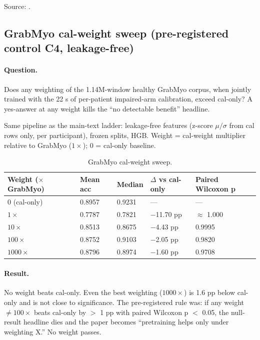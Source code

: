 \documentclass{article}
\begin{document}
Source: .

\subsection{GrabMyo cal-weight sweep (pre-registered control C4, leakage-free)}
\label{app:sweep-weights}

\paragraph{Question.} Does any weighting of the 1.14M-window healthy GrabMyo corpus, when jointly trained with the 22 s of per-patient impaired-arm calibration, exceed cal-only? A yes-answer at any weight kills the ``no detectable benefit'' headline.

Same pipeline as the main-text ladder: leakage-free features (z-score $\mu/\sigma$ from cal rows only, per participant), frozen splits, HGB. Weight = cal-weight multiplier relative to GrabMyo ($1\times$); 0 = cal-only baseline.

\begin{table}[h]
  \caption{GrabMyo cal-weight sweep.}
  \label{tab:weights}
  \centering
  \small
  \begin{tabular}{lllll}
    \toprule
    Weight ($\times$ GrabMyo) & Mean acc & Median & $\Delta$ vs cal-only & Paired Wilcoxon p \\
    \midrule
    0 (cal-only) & 0.8957 & 0.9231 & --- & --- \\
    $1\times$ & 0.7787 & 0.7821 & $-$11.70 pp & $\approx$ 1.000 \\
    $10\times$ & 0.8513 & 0.8675 & $-$4.43 pp & 0.9995 \\
    $100\times$ & 0.8752 & 0.9103 & $-$2.05 pp & 0.9820 \\
    $1000\times$ & 0.8796 & 0.8974 & $-$1.60 pp & 0.9708 \\
    \bottomrule
  \end{tabular}
\end{table}

\paragraph{Result.} No weight beats cal-only. Even the best weighting ($1000\times$) is 1.6 pp below cal-only and is not close to significance. The pre-registered rule was: if any weight $\neq 100\times$ beats cal-only by $>$ 1 pp with paired Wilcoxon p $<$ 0.05, the null-result headline dies and the paper becomes ``pretraining helps only under weighting X.'' No weight passes.
\end{document}
